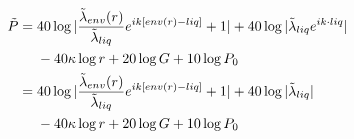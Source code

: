 \documentclass{article}
\begin{document}
\begin{align}
        \tilde{P}={}& 40\log |\frac{\tilde{\lambda}_{env}(r)}{\tilde{\lambda}_{liq}}e^{ik[env(r)-liq]} + 1|+40\log|\tilde{\lambda}_{liq}e^{ik\cdot liq}| \notag \\
        &{} -40\kappa\log r+20\log G+10\log P_0 \notag \\
                ={}& 40\log |\frac{\tilde{\lambda}_{env}(r)}{\tilde{\lambda}_{liq}}e^{ik[env(r)-liq]} + 1|+40\log|\tilde{\lambda}_{liq}|\notag \\
        &{} -40\kappa\log r+20\log G+10\log P_0
\end{align}
\end{document}
